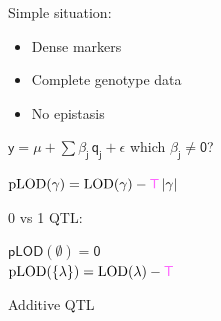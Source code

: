 \documentclass[12pt]{article}
\newcommand{\headsize}{\fontsize{35}{35} \selectfont}
\newcommand{\smallersize}{\fontsize{20}{25} \selectfont}
\newcommand{\smallestsize}{\fontsize{18}{22} \selectfont}
\newcommand{\lod}{\text{LOD}}
\newcommand{\plod}{\text{pLOD}}
\begin{document}
\hfill \begin{minipage}{10in}

Simple situation:

{\smallestsize
\color{myblue}
\begin{itemize}
\item Dense markers
\item Complete genotype data
\item No epistasis

\end{itemize} }

\vspace{2cm}

\centerline{
$\mathsf{y  = \mu + \sum \beta_j \, q_j + \epsilon}$ \hspace{1cm}
       {\color{mypink} which $\mathsf{\beta_j \ne 0}$?}
}

\vspace{2cm}

{\color{myyellow}
$\mathsf{ \plod(\gamma) = \lod(\gamma) -
    {\color{mypink} T} \, |\gamma| }$
}

\vspace{2cm}

\begin{minipage}[t]{1.4in}
\vspace*{0mm}

0 vs 1 QTL:
\end{minipage}
\begin{minipage}[t]{6in}
\vspace*{0mm}

\color{myblue}
$\mathsf{\plod(\emptyset) = 0}$ \\[16pt]
$\mathsf{\plod(\{\lambda\}) =
    \lod(\lambda) - {\color{mypink} T}}$
\end{minipage}


\end{minipage}



\newpage

\addtocounter{page}{-1}

\headsize \color{myyellow}
\hfill \begin{minipage}{5.75in}
\centering
Additive QTL
\end{minipage}

\vspace{2cm} \color{mywhite} \smallersize
\end{document}
